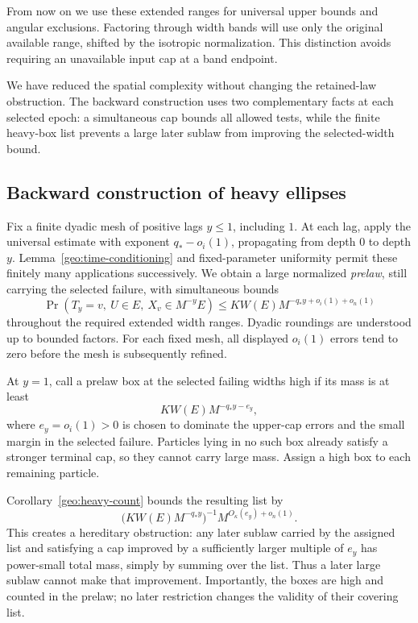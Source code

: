 From now on we use these extended ranges for universal upper
bounds and angular exclusions.  Factoring through width bands
will use only the original available range, shifted by the
isotropic normalization.  This distinction avoids requiring
an unavailable input cap at a band endpoint.

We have reduced the spatial complexity without changing the
retained-law obstruction.  The backward construction uses two
complementary facts at each selected epoch: a simultaneous cap bounds
all allowed tests, while the finite heavy-box list prevents a large
later sublaw from improving the selected-width bound.

\subsection{Backward construction of heavy ellipses}

Fix a finite dyadic mesh of positive lags \(y\le1\), including
\(1\).  At each lag, apply the universal estimate with exponent
\(q_*-o_i(1)\), propagating from depth \(0\) to depth \(y\).
Lemma~\ref{geo:time-conditioning} and fixed-parameter uniformity
permit these finitely many applications successively.  We
obtain a large normalized \emph{prelaw}, still carrying the
selected failure, with simultaneous bounds
\begin{equation}\label{geo:prelaw-caps}
\Pr(T_y=v,\ U\in E,\ X_v\in M^{-y}E)
\le KW(E)M^{-q_*y+o_i(1)+o_n(1)}
\end{equation}
throughout the required extended width ranges.  Dyadic
roundings are understood up to bounded factors.  For each
fixed mesh, all displayed \(o_i(1)\) errors tend to zero
before the mesh is subsequently refined.

At \(y=1\), call a prelaw box at the selected failing widths
high if its mass is at least
\[
KW(E)M^{-q_*y-e_y},
\]
where \(e_y=o_i(1)>0\) is chosen to dominate the upper-cap
errors and the small margin in the selected failure.
Particles lying in no such box already satisfy a stronger
terminal cap, so they cannot carry large mass.  Assign a
high box to each remaining particle.

Corollary~\ref{geo:heavy-count} bounds the resulting list by
\[
\bigl(KW(E)M^{-q_*y}\bigr)^{-1}
M^{O_\kappa(e_y)+o_n(1)}.
\]
This creates a hereditary obstruction: any later sublaw
carried by the assigned list and satisfying a cap improved
by a sufficiently larger multiple of \(e_y\) has power-small
total mass, simply by summing over the list.  Thus a later
large sublaw cannot make that improvement.  Importantly,
the boxes are high and counted in the prelaw; no later
restriction changes the validity of their covering list.

